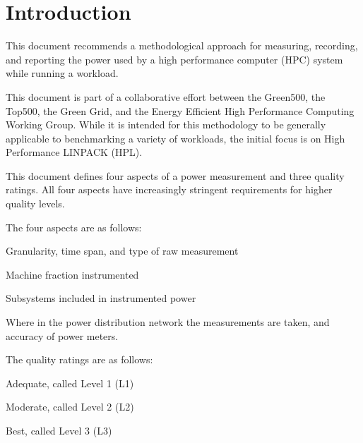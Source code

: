 \chapter{Introduction}
\label{sec:intro}

\noindent
This document recommends a methodological approach for measuring, recording, and reporting the power used by a high performance 
computer (HPC) system while
running a workload. 
\wl

\noindent
This document is part of a collaborative effort between the Green500, the Top500, 
the Green Grid, and the Energy Efficient High Performance Computing Working Group.  While 
it is intended for this methodology to be generally applicable to benchmarking a variety of 
workloads, the initial focus is on High Performance LINPACK (HPL). 
\wl

\noindent
This document defines four aspects of a power measurement and three quality ratings. All 
four aspects have increasingly stringent requirements for higher quality levels.  
\wl

\noindent
The four aspects are as follows:


\begin{packed_enum}
\item 
Granularity, time span, and type of raw measurement
\item 
Machine fraction instrumented
\item 
Subsystems included in instrumented power
\item 
Where in the power distribution network the measurements are taken, and accuracy of power meters.
\end{packed_enum}

The quality ratings are as follows:

\begin{packed_item}
\item 
Adequate, called Level 1 (L1)
\item
Moderate, called Level 2 (L2)
\item
Best, called Level 3 (L3)
\end{packed_item}

